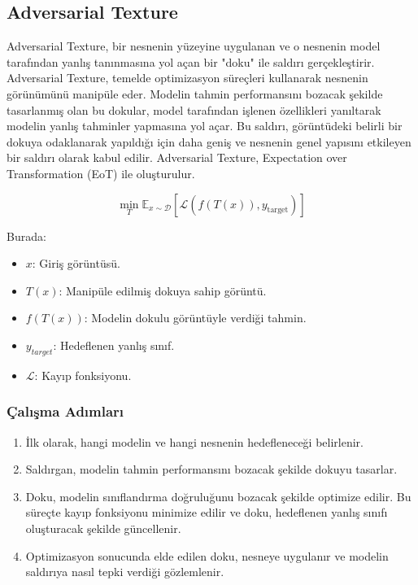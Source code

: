 \newpage

\subsection{Adversarial Texture}

Adversarial Texture, bir nesnenin yüzeyine uygulanan ve o nesnenin model tarafından yanlış tanınmasına yol açan bir "doku" ile saldırı gerçekleştirir. Adversarial Texture, temelde optimizasyon süreçleri kullanarak nesnenin görünümünü manipüle eder. Modelin tahmin performansını bozacak şekilde tasarlanmış olan bu dokular, model tarafından işlenen özellikleri yanıltarak modelin yanlış tahminler yapmasına yol açar. Bu saldırı, görüntüdeki belirli bir dokuya odaklanarak yapıldığı için daha geniş ve nesnenin genel yapısını etkileyen bir saldırı olarak kabul edilir. Adversarial Texture, Expectation over Transformation (EoT) ile oluşturulur. 

\[ \min_{T} \mathbb{E}_{x \sim \mathcal{D}} \left[ \mathcal{L}(f(T(x)), y_{\text{target}}) \right] \]

Burada:

\begin{itemize}
    \item $x$: Giriş görüntüsü.
    \item $T(x)$: Manipüle edilmiş dokuya sahip görüntü.
    \item $f(T(x))$: Modelin dokulu görüntüyle verdiği tahmin.
    \item $y_{target}$: Hedeflenen yanlış sınıf.
    \item $\mathcal{L}$: Kayıp fonksiyonu.
\end{itemize}

\subsubsection{Çalışma Adımları}

\begin{enumerate}
    \item İlk olarak, hangi modelin ve hangi nesnenin hedefleneceği belirlenir.
    \item Saldırgan, modelin tahmin performansını bozacak şekilde dokuyu tasarlar.
    \item Doku, modelin sınıflandırma doğruluğunu bozacak şekilde optimize edilir. Bu süreçte kayıp fonksiyonu minimize edilir ve doku, hedeflenen yanlış sınıfı oluşturacak şekilde güncellenir.
    \item Optimizasyon sonucunda elde edilen doku, nesneye uygulanır ve modelin saldırıya nasıl tepki verdiği gözlemlenir.
\end{enumerate}

